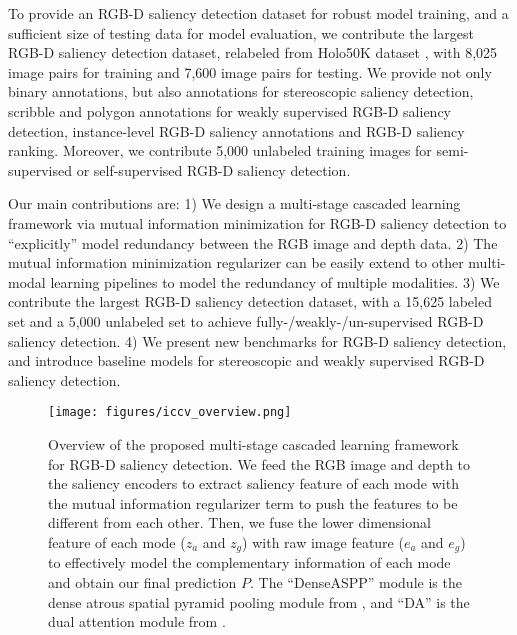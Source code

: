 \documentclass[10pt,twocolumn,letterpaper]{article}
\begin{document}
To provide an RGB-D saliency detection dataset for robust model training, and a sufficient size of
testing data for model evaluation, we contribute the largest
RGB-D saliency detection dataset, relabeled from Holo50K dataset \cite{hua2020holopix50k}, with 8,025 image pairs for training and 7,600 image pairs for testing. We provide not only binary annotations, but also
annotations for stereoscopic saliency detection, scribble and polygon annotations for weakly supervised RGB-D saliency detection, instance-level RGB-D saliency annotations and RGB-D saliency ranking.
Moreover, we contribute 5,000 unlabeled training images for semi-supervised or self-supervised RGB-D saliency detection.

Our main contributions are: 1)
We design a multi-stage cascaded learning framework via mutual information minimization for
RGB-D saliency detection
to \enquote{explicitly} model redundancy between the
RGB image and 
depth data.
    2) The mutual information minimization regularizer can be easily extend to other multi-modal learning pipelines to model the redundancy of multiple modalities.
3) We contribute the largest RGB-D saliency detection dataset, with a 15,625 labeled set and a 5,000 unlabeled set to achieve
fully-/weakly-/un-supervised RGB-D saliency detection.
4) We present new benchmarks for RGB-D saliency detection, and introduce baseline models for stereoscopic and weakly supervised RGB-D saliency detection.

\begin{figure*}[tbp]
\centering
\texttt{[image: figures/iccv\_overview.png]}
\vspace{-5pt}
   \caption{Overview of the proposed multi-stage cascaded learning framework for RGB-D saliency detection.
We feed the RGB image and depth to the saliency encoders to extract saliency feature of each mode
with the mutual information regularizer term to push the features to be different from each other. Then, we fuse the lower dimensional feature of each mode ($z_a$ and $z_g$) with raw image feature ($e_a$ and $e_g$) to effectively model the complementary information of each mode and obtain our final prediction $P$. The \enquote{DenseASPP} module is the dense atrous spatial pyramid pooling module from \cite{denseaspp}, and \enquote{DA} is the dual attention module from \cite{fu2019dual}.
}
   \label{fig:network_overview}
\end{figure*}
\end{document}
